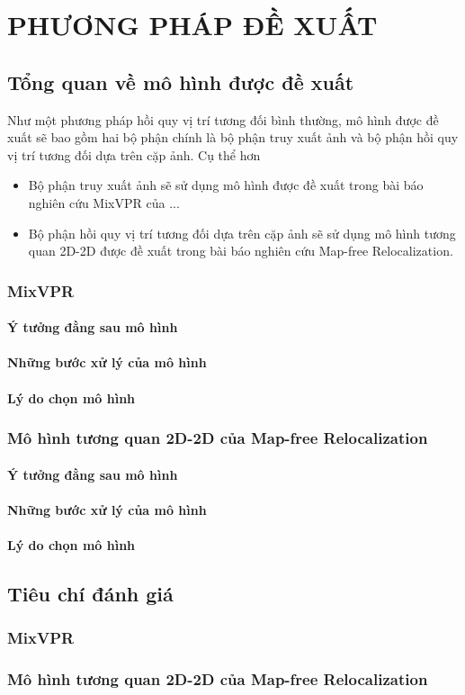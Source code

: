 \chapter{PHƯƠNG PHÁP ĐỀ XUẤT}

\section{Tổng quan về mô hình được đề xuất}
Như một phương pháp hồi quy vị trí tương đối bình thường, mô hình được đề xuất sẽ bao gồm hai bộ phận chính là bộ phận truy xuất ảnh và bộ phận hồi quy vị trí tương đối dựa trên cặp ảnh. Cụ thể hơn
\begin{itemize}
    \item Bộ phận truy xuất ảnh sẽ sử dụng mô hình được đề xuất trong bài báo nghiên cứu MixVPR của ...
    \item Bộ phận hồi quy vị trí tương đối dựa trên cặp ảnh sẽ sử dụng mô hình tương quan 2D-2D được đề xuất trong bài báo nghiên cứu Map-free Relocalization.
\end{itemize}

\subsection{MixVPR}
\subsubsection*{Ý tưởng đằng sau mô hình}
\subsubsection*{Những bước xử lý của mô hình}
\subsubsection*{Lý do chọn mô hình}

\subsection{Mô hình tương quan 2D-2D của Map-free Relocalization}
\subsubsection*{Ý tưởng đằng sau mô hình}
\subsubsection*{Những bước xử lý của mô hình}
\subsubsection*{Lý do chọn mô hình}

\section{Tiêu chí đánh giá}
\subsection{MixVPR}
\subsection{Mô hình tương quan 2D-2D của Map-free Relocalization}


